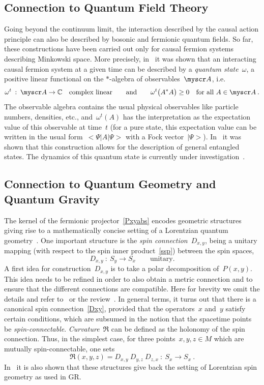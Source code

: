 \documentclass[reqno,11pt]{amsart}
\numberwithin{equation}{section}
\newcommand{\beq}{\begin{equation}}
\newcommand{\eeq}{\end{equation}}
\newcommand{\bra}{\mathopen{<}}
\newcommand{\ket}{\mathclose{>}}
\newcommand{\C}{\mathbb{C}}
\newcommand{\1}{\mbox{\rm 1 \hspace{-1.05 em} 1}}
\newcommand{\A}{\myscr A}
\begin{document}
\subsection{Connection to Quantum Field Theory} \label{secqft}
Going beyond the continuum limit, the interaction described by the causal action principle
can also be described by bosonic and fermionic quantum fields.
So far, these constructions have been carried out only for causal fermion systems
describing Minkowski space. More precisely, in~\cite{fockbosonic, fockfermionic}
it was shown that an interacting causal fermion system at a given time can be described
by a {\em{quantum state}}~$\omega$, a positive linear functional on the $*$-algebra of
observables~$\A$, i.e.\
\[ \omega^t \::\: \A \rightarrow \C \quad \text{complex linear} \qquad \text{and} \qquad
\omega^t \big( A^* A \big) \geq 0 \quad \text{for all~$A \in \A$}\:. \]
The observable algebra contains the usual physical observables like particle numbers,
densities, etc., and~$\omega^t(A)$ has the interpretation as the expectation value of this
observable at time~$t$ (for a pure state, this expectation value can be written in the usual
form~$\bra \Psi | A | \Psi \ket$ with a Fock vector~$|\Psi \ket$).
In~\cite{fockentangle} it was shown that this construction allows for the
description of general entangled states. The dynamics of this quantum state is
currently under investigation~\cite{fockdynamics}.

\subsection{Connection to Quantum Geometry and Quantum Gravity} \label{secqg}
The kernel of the fermionic projector~\eqref{Pxyabs} encodes geometric structures
giving rise to a mathematically concise setting of a Lorentzian quantum geometry~\cite{lqg}.
One important structure is the {\em{spin connection}}~$D_{x,y}$, being a unitary mapping (with respect to the spin inner product~\eqref{ssp}) between
the spin spaces,
\beq \label{Dxy}
D_{x,y} \::\: S_y \rightarrow S_x \qquad \text{unitary}.
\eeq
A first idea for construction~$D_{x,y}$ is to take a polar decomposition of~$P(x,y)$.
This idea needs to be refined in order to also obtain a metric connection and to ensure
that the different connections are compatible. Here for brevity we omit the details and refer
to~\cite{lqg} or the review~\cite{nrstg}. In general terms, it turns out that there is a canonical
spin connection~\eqref{Dxy}, provided that the operators~$x$ and~$y$ satisfy certain conditions,
which are subsumed in the notion that the spacetime points be {\em{spin-connectable}}.
{\em{Curvature}}~$\mathfrak{R}$ can be defined as the holonomy of the spin connection.
Thus, in the simplest case, for three points~$x,y,z \in M$ which are mutually spin-connectable,
one sets
\[ \mathfrak{R}(x,y,z) = D_{x,y}\: D_{y,z}\:D_{z,x} \::\: S_x \rightarrow S_x \:. \]
In~\cite{lqg} it is also shown that these structures give back the setting of Lorentzian spin geometry
as used in GR.
\end{document}
